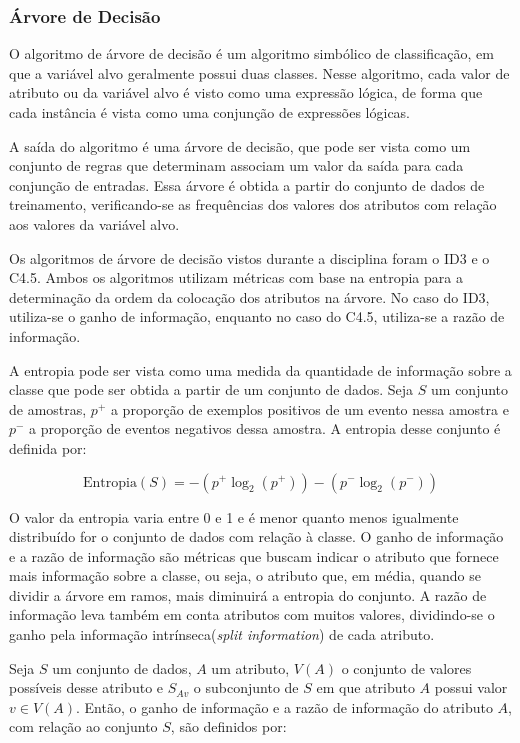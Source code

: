 \documentclass{article}
\begin{document}
\subsubsection{Árvore de Decisão}

O algoritmo de árvore de decisão é um algoritmo simbólico de classificação, em que a variável alvo geralmente possui duas classes.
Nesse algoritmo, cada valor de atributo ou da variável alvo é visto como uma expressão lógica, de forma que cada instância é vista como uma conjunção de expressões lógicas.

A saída do algoritmo é uma árvore de decisão, que pode ser vista como um conjunto de regras que determinam associam um valor da saída para cada conjunção de entradas.
Essa árvore é obtida a partir do conjunto de dados de treinamento, verificando-se as frequências dos valores dos atributos com relação aos valores da variável alvo.

Os algoritmos de árvore de decisão vistos durante a disciplina foram o ID3 e o C4.5.
Ambos os algoritmos utilizam métricas com base na entropia para a determinação da ordem da colocação dos atributos na árvore.
No caso do ID3, utiliza-se o ganho de informação, enquanto no caso do C4.5, utiliza-se a razão de informação.

A entropia pode ser vista como uma medida da quantidade de informação sobre a classe que pode ser obtida a partir de um conjunto de dados.
Seja $S$ um conjunto de amostras, $p^+$ a proporção de exemplos positivos de um evento nessa amostra e $p^-$ a proporção de eventos negativos dessa amostra.
A entropia desse conjunto é definida por:

\begin{equation}
\mathrm{Entropia}(S) = -(p^+ \log_2(p^+)) - (p^- \log_2(p^-))
\end{equation}

O valor da entropia varia entre 0 e 1 e é menor quanto menos igualmente distribuído for o conjunto de dados com relação à classe.
O ganho de informação e a razão de informação são métricas que buscam indicar o atributo que fornece mais informação sobre a classe,
ou seja, o atributo que, em média, quando se dividir a árvore em ramos, mais diminuirá a entropia do conjunto.
A razão de informação leva também em conta atributos com muitos valores, dividindo-se o ganho pela informação intrínseca({\it split information}) de cada atributo.

Seja $S$ um conjunto de dados, $A$ um atributo, $V(A)$ o conjunto de valores possíveis desse atributo e $S_{Av}$ o subconjunto de $S$ em que atributo $A$ possui valor $v \in V(A)$.
Então, o ganho de informação e a razão de informação do atributo $A$, com relação ao conjunto $S$, são definidos por:
\end{document}
